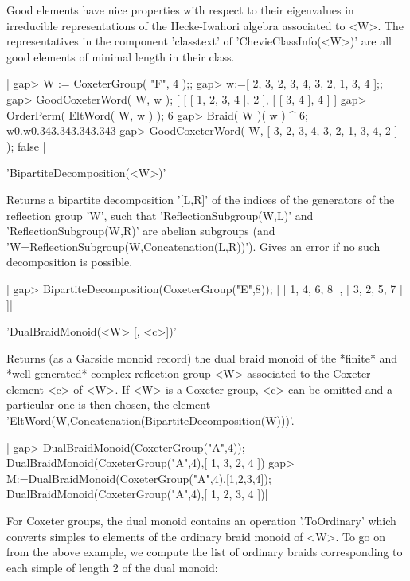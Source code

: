 Good  elements have  nice properties  with respect  to their eigenvalues in
irreducible  represen\-tations of  the Hecke-Iwahori  algebra associated to
<W>. The representatives in the component 'classtext' of
'ChevieClassInfo(<W>)'  are all  good elements  of minimal  length in their
class.

|    gap> W := CoxeterGroup( "F", 4 );;
    gap> w:=[ 2, 3, 2, 3, 4, 3, 2, 1, 3, 4 ];;
    gap> GoodCoxeterWord( W, w );
    [ [ [ 1, 2, 3, 4 ], 2 ], [ [ 3, 4 ], 4 ] ]
    gap> OrderPerm( EltWord( W, w ) );
    6
    gap> Braid( W )( w ) ^ 6;
    w0.w0.343.343.343.343
    gap>  GoodCoxeterWord( W, [ 3, 2, 3, 4, 3, 2, 1, 3, 4, 2 ] );
    false |


'BipartiteDecomposition(<W>)'

Returns  a bipartite decomposition '[L,R]' of the indices of the generators
of  the  reflection  group  'W',  such  that  'ReflectionSubgroup(W,L)' and
'ReflectionSubgroup(W,R)' are abelian subgroups (and
'W=ReflectionSubgroup(W,Concatenation(L,R))').  Gives an  error if  no such
decomposition is possible.

|    gap> BipartiteDecomposition(CoxeterGroup("E",8));
    [ [ 1, 4, 6, 8 ], [ 3, 2, 5, 7 ] ]|


'DualBraidMonoid(<W> [, <c>])'

Returns  (as a Garside monoid record) the dual braid monoid of the *finite*
and *well-generated* complex reflection group <W> associated to the Coxeter
element  <c> of <W>.  If <W> is  a Coxeter group,  <c> can be omitted and a
particular one is then chosen, the element
'EltWord(W,Concatenation(BipartiteDecomposition(W)))'.

|    gap> DualBraidMonoid(CoxeterGroup("A",4));
    DualBraidMonoid(CoxeterGroup("A",4),[ 1, 3, 2, 4 ])
    gap> M:=DualBraidMonoid(CoxeterGroup("A",4),[1,2,3,4]);
    DualBraidMonoid(CoxeterGroup("A",4),[ 1, 2, 3, 4 ])|

For  Coxeter groups,  the dual  monoid contains  an operation '.ToOrdinary'
which  converts simples to elements of the ordinary braid monoid of <W>. To
go  on  from  the  above  example,  we  compute the list of ordinary braids
corresponding to each simple of length 2 of the dual monoid:

